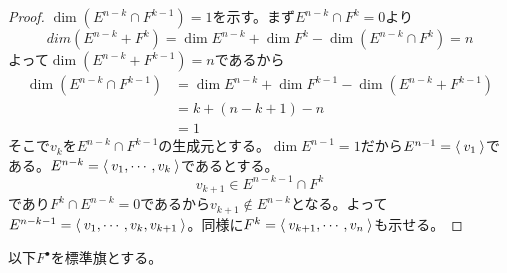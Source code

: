 \documentclass{ltjsreport}
\begin{document}
\begin{proof}
  $\dim (E^{n-k}\cap F^{k-1})=1$を示す。まず$E^{n-k}\cap F^{k}=0$より
  \[
  dim(E^{n-k}+F^k)=\dim E^{n-k}+\dim F^k -\dim(E^{n-k}\cap F^{k})=n
  \]
  よって$\dim (E^{n-k}+F^{k-1})=n$であるから
  \begin{align*}
    \dim (E^{n-k}\cap F^{k-1})
    &=\dim E^{n-k}+\dim F^{k-1}-\dim(E^{n-k}+F^{k-1})\\
    &=k+(n-k+1)-n\\
    &=1
  \end{align*}
  そこで$v_k$を$E^{n-k}\cap F^{k-1}$の生成元とする。$\dim E^{n-1}=1$だから$E^{n-1}=\langle\:v_1\:\rangle$である。$E^{n-k}=\langle\:v_1,\cdots,v_k\:\rangle$であるとする。
  \[
  v_{k+1}\in E^{n-k-1}\cap F^{k}  
  \]
  であり$F^k\cap E^{n-k}=0$であるから$v_{k+1}\notin E^{n-k}$となる。よって$E^{n-k-1}=\langle\:v_1,\cdots,v_k,v_{k+1}\:\rangle$。同様に$F^k=\langle\:v_{k+1},\cdots,v_n\:\rangle$も示せる。
\end{proof}

以下$F^\bullet$を標準旗とする。
\end{document}
